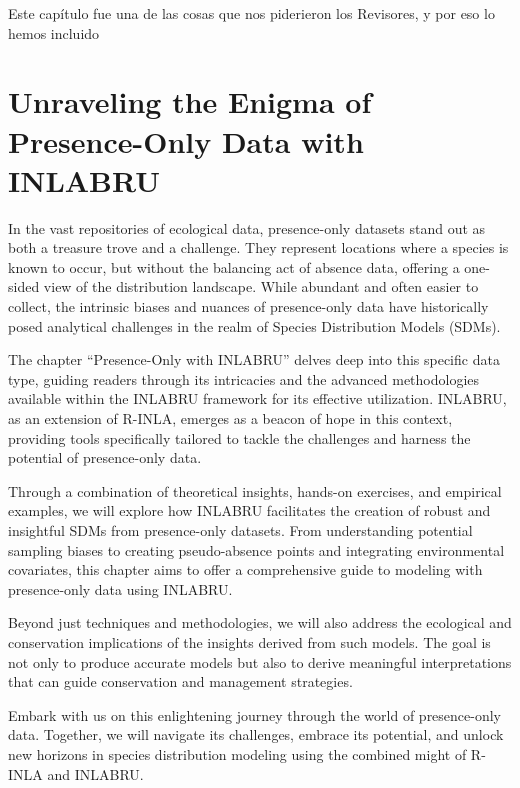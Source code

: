\documentclass[
]{krantz}
\begin{document}
Este capítulo fue una de las cosas que nos piderieron los Revisores, y por eso lo hemos incluido

\hypertarget{unraveling-the-enigma-of-presence-only-data-with-inlabru}{%
\section{Unraveling the Enigma of Presence-Only Data with INLABRU}\label{unraveling-the-enigma-of-presence-only-data-with-inlabru}}

In the vast repositories of ecological data, presence-only datasets stand out as both a treasure trove and a challenge. They represent locations where a species is known to occur, but without the balancing act of absence data, offering a one-sided view of the distribution landscape. While abundant and often easier to collect, the intrinsic biases and nuances of presence-only data have historically posed analytical challenges in the realm of Species Distribution Models (SDMs).

The chapter ``Presence-Only with INLABRU'' delves deep into this specific data type, guiding readers through its intricacies and the advanced methodologies available within the INLABRU framework for its effective utilization. INLABRU, as an extension of R-INLA, emerges as a beacon of hope in this context, providing tools specifically tailored to tackle the challenges and harness the potential of presence-only data.

Through a combination of theoretical insights, hands-on exercises, and empirical examples, we will explore how INLABRU facilitates the creation of robust and insightful SDMs from presence-only datasets. From understanding potential sampling biases to creating pseudo-absence points and integrating environmental covariates, this chapter aims to offer a comprehensive guide to modeling with presence-only data using INLABRU.

Beyond just techniques and methodologies, we will also address the ecological and conservation implications of the insights derived from such models. The goal is not only to produce accurate models but also to derive meaningful interpretations that can guide conservation and management strategies.

Embark with us on this enlightening journey through the world of presence-only data. Together, we will navigate its challenges, embrace its potential, and unlock new horizons in species distribution modeling using the combined might of R-INLA and INLABRU.
\end{document}

